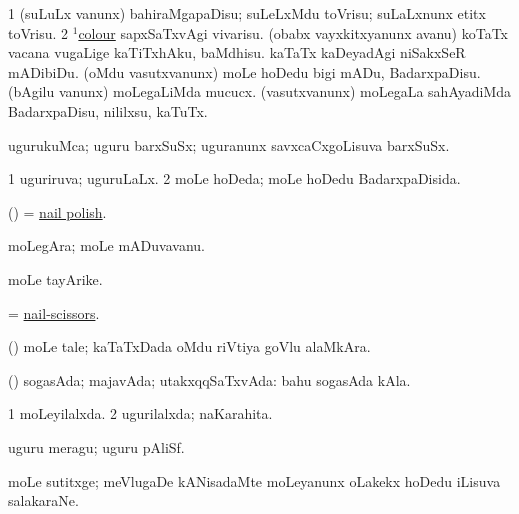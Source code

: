 \noindent
\gl{\pagu}
\bmng
\bnum
\num{1} (suLuLx \mo vanunx) bahiraMgapaDisu; suLeLxMdu toVrisu; suLaLxnunx etitx toVrisu. 
\num{2}  \hyperref{kandict_c.pdf}{C}{color(1) nuga(9)}{$^1$colour} 
  
\banum
{} sapxSaTxvAgi vivarisu. 
 (obabx vayxkitxyanunx avanu) koTaTx vacana \mo vugaLige kaTiTxhAku, baMdhisu. 
 kaTaTx kaDeyadAgi niSakxSeR mADibiDu. 
 (oMdu vasutxvanunx) moLe hoDedu bigi mADu, BadarxpaDisu. 
\eanum
\numie
{}  
\banum
{} (bAgilu \mo vanunx) moLegaLiMda mucucx. 
 (vasutxvanunx) moLegaLa sahAyadiMda BadarxpaDisu, nililxsu, kaTuTx. 
\eanum
\numie
\enum
\emng
\eentry

\bentry
{}
\gl{\nA}
\bmng
ugurukuMca; uguru barxSuSx; uguranunx savxcaCxgoLisuva barxSuSx. 
\emng
\eentry

\bentry
{}
\gl{\gu}
\bmng
\bnum
\num{1} uguriruva; uguruLaLx. 
\num{2} moLe hoDeda; moLe hoDedu BadarxpaDisida. 
\enum
\emng
\eentry

\bentry
{}
\gl{\nA}
\bmng
(\ame) = \hyperlink{nail polish}{nail polish}.
\emng
\eentry

\bentry
{}
\gl{\nA}
\bmng
moLegAra; moLe mADuvavanu. 
\emng
\eentry

\bentry
{}
\gl{\nA}
\bmng
moLe tayArike. 
\emng
\eentry

\bentry
{}
\gl{\nA}
\bmng
= \hyperlink{nail-scissors}{nail-scissors}.
\emng
\eentry

\bentry
{}
\gl{\nA}
\bmng
(\vAshi) moLe tale; kaTaTxDada oMdu riVtiya goVlu alaMkAra. 
\emng
\eentry

\bentry
{}
\gl{\gu}
\bmng
(\pArxparx) sogasAda; majavAda; utakxqqSaTxvAda:  bahu sogasAda kAla. 
\emng
\eentry

\bentry
{}
\gl{\gu}
\bmng
\bnum
\num{1} moLeyilalxda. 
\num{2} ugurilalxda; naKarahita. 
\enum
\emng
\eentry

\bentry
{}
\gl{\nA}
\bmng
uguru meragu; uguru pAliSf. 
\emng
\eentry

\bentry
{}
\gl{\nA}
\bmng
moLe sutitxge; meVlugaDe kANisadaMte moLeyanunx oLakekx hoDedu iLisuva salakaraNe. 
\emng
\eentry

